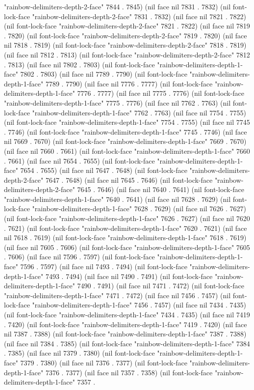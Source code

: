 "rainbow-delimiters-depth-2-face" 7844 . 7845) (nil face nil 7831 . 7832) (nil font-lock-face "rainbow-delimiters-depth-2-face" 7831 . 7832) (nil face nil 7821 . 7822) (nil font-lock-face "rainbow-delimiters-depth-2-face" 7821 . 7822) (nil face nil 7819 . 7820) (nil font-lock-face "rainbow-delimiters-depth-2-face" 7819 . 7820) (nil face nil 7818 . 7819) (nil font-lock-face "rainbow-delimiters-depth-2-face" 7818 . 7819) (nil face nil 7812 . 7813) (nil font-lock-face "rainbow-delimiters-depth-2-face" 7812 . 7813) (nil face nil 7802 . 7803) (nil font-lock-face "rainbow-delimiters-depth-1-face" 7802 . 7803) (nil face nil 7789 . 7790) (nil font-lock-face "rainbow-delimiters-depth-1-face" 7789 . 7790) (nil face nil 7776 . 7777) (nil font-lock-face "rainbow-delimiters-depth-1-face" 7776 . 7777) (nil face nil 7775 . 7776) (nil font-lock-face "rainbow-delimiters-depth-1-face" 7775 . 7776) (nil face nil 7762 . 7763) (nil font-lock-face "rainbow-delimiters-depth-1-face" 7762 . 7763) (nil face nil 7754 . 7755) (nil font-lock-face "rainbow-delimiters-depth-1-face" 7754 . 7755) (nil face nil 7745 . 7746) (nil font-lock-face "rainbow-delimiters-depth-1-face" 7745 . 7746) (nil face nil 7669 . 7670) (nil font-lock-face "rainbow-delimiters-depth-1-face" 7669 . 7670) (nil face nil 7660 . 7661) (nil font-lock-face "rainbow-delimiters-depth-1-face" 7660 . 7661) (nil face nil 7654 . 7655) (nil font-lock-face "rainbow-delimiters-depth-1-face" 7654 . 7655) (nil face nil 7647 . 7648) (nil font-lock-face "rainbow-delimiters-depth-2-face" 7647 . 7648) (nil face nil 7645 . 7646) (nil font-lock-face "rainbow-delimiters-depth-2-face" 7645 . 7646) (nil face nil 7640 . 7641) (nil font-lock-face "rainbow-delimiters-depth-1-face" 7640 . 7641) (nil face nil 7628 . 7629) (nil font-lock-face "rainbow-delimiters-depth-1-face" 7628 . 7629) (nil face nil 7626 . 7627) (nil font-lock-face "rainbow-delimiters-depth-1-face" 7626 . 7627) (nil face nil 7620 . 7621) (nil font-lock-face "rainbow-delimiters-depth-1-face" 7620 . 7621) (nil face nil 7618 . 7619) (nil font-lock-face "rainbow-delimiters-depth-1-face" 7618 . 7619) (nil face nil 7605 . 7606) (nil font-lock-face "rainbow-delimiters-depth-1-face" 7605 . 7606) (nil face nil 7596 . 7597) (nil font-lock-face "rainbow-delimiters-depth-1-face" 7596 . 7597) (nil face nil 7493 . 7494) (nil font-lock-face "rainbow-delimiters-depth-1-face" 7493 . 7494) (nil face nil 7490 . 7491) (nil font-lock-face "rainbow-delimiters-depth-1-face" 7490 . 7491) (nil face nil 7471 . 7472) (nil font-lock-face "rainbow-delimiters-depth-1-face" 7471 . 7472) (nil face nil 7456 . 7457) (nil font-lock-face "rainbow-delimiters-depth-1-face" 7456 . 7457) (nil face nil 7434 . 7435) (nil font-lock-face "rainbow-delimiters-depth-1-face" 7434 . 7435) (nil face nil 7419 . 7420) (nil font-lock-face "rainbow-delimiters-depth-1-face" 7419 . 7420) (nil face nil 7387 . 7388) (nil font-lock-face "rainbow-delimiters-depth-1-face" 7387 . 7388) (nil face nil 7384 . 7385) (nil font-lock-face "rainbow-delimiters-depth-1-face" 7384 . 7385) (nil face nil 7379 . 7380) (nil font-lock-face "rainbow-delimiters-depth-1-face" 7379 . 7380) (nil face nil 7376 . 7377) (nil font-lock-face "rainbow-delimiters-depth-1-face" 7376 . 7377) (nil face nil 7357 . 7358) (nil font-lock-face "rainbow-delimiters-depth-1-face" 7357 . 